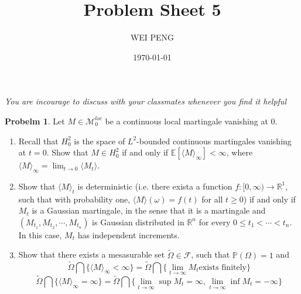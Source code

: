 \documentclass{article}     %
\title{Problem Sheet 5}  %
\author{WEI PENG}      %
\date{\today}      %
\begin{document}
\maketitle                   %

\emph{You are incourage to discuss with your classmates whenever you find it helpful}

\noindent
\textbf{Probelm 1}. Let $M\in \mathcal{M}_0^{loc}$ be a continuous local martingale vanishing at 0.

\begin{enumerate}[(1)]
    \item Recall that $H_0^2$ is the space of $L^2$-bounded continuous martingales vanishing at $t=0$. Show that $M\in H_0^2$ if and only if $\mathbb{E}[\langle M \rangle_{\infty}]<\infty$, where $\langle M \rangle_{\infty}= \lim_{t\rightarrow 0} \langle M_t \rangle$.
    \item Show that $\langle M \rangle_t$ is deterministic (i.e. there exista a function $f:[0,\infty)\rightarrow \mathbb{R}^1$, such that with probability one, $\langle M \rangle  (\omega)=f(t)$ for all $t\geq 0$) if and only if $M_t$ is a Gaussian martingale, in the sense that it is a martingale and $(M_{t_1},M_{t_2},\cdots, M_{t_n})$ is Gaussian distributed in $\mathbb{R}^n$ for every $0\leq t_1<\cdots < t_n$. In this case, $M_t$ has independent increments.
    \item Show that there exists a mesasurable set $\widetilde{\Omega}\in \mathcal{F}$, such that $\mathbb{P}(\Omega)=1$ and 
    \[\widetilde{\Omega}\bigcap \{\langle M \rangle_{\infty}<\infty\} = \widetilde{\Omega}\bigcap \{\lim_{t\rightarrow \infty} M_t \text{exists finitely}\}\]
    \[\widetilde{\Omega}\bigcap \{\langle M \rangle _{\infty}=\infty\} = \widetilde{\Omega}\bigcap \{ \lim_{t\rightarrow \infty}\sup M_t =\infty, \lim_{t\rightarrow \infty}\inf M_t = - \infty\} \]

\end{enumerate}
\end{document}
